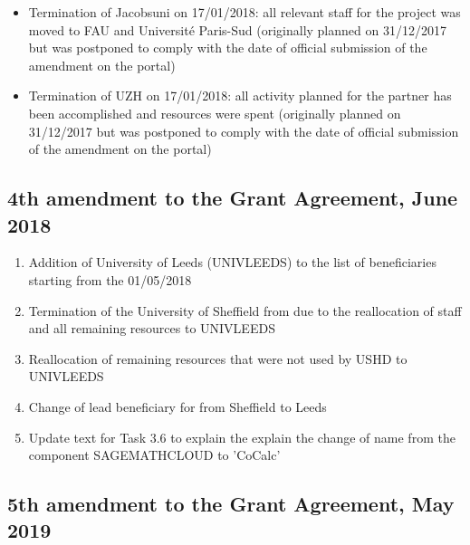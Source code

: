 \begin{enumerate}
\begin{itemize}
  \item Termination of Jacobsuni on 17/01/2018: all relevant staff for the project was moved to FAU and Université Paris-Sud (originally planned on 31/12/2017 but was postponed to comply with the date of official submission of the amendment on the portal)
  \item Termination of UZH on 17/01/2018: all activity planned for the partner has been accomplished and resources were spent (originally planned on 31/12/2017 but was postponed to comply with the date of official submission of the amendment on the portal)
  \end{itemize}
\end{enumerate}
\clearpage

\thispagestyle{empty}
\subsection*{4th amendment to the Grant Agreement, June 2018}

\begin{enumerate}
\item Addition of University of Leeds (UNIVLEEDS) to the list of beneficiaries starting from the 01/05/2018
\item Termination of the University of Sheffield from \TheProject due to the reallocation of staff and all remaining resources to UNIVLEEDS
\item Reallocation of remaining resources that were not used by USHD to UNIVLEEDS
\item Change of lead beneficiary for  from Sheffield to Leeds
\item Update text for Task 3.6 to explain the explain the change of name from the component SAGEMATHCLOUD to 'CoCalc'
\end{enumerate}
\clearpage

\thispagestyle{empty}
\subsection*{5th amendment to the Grant Agreement, May 2019}

